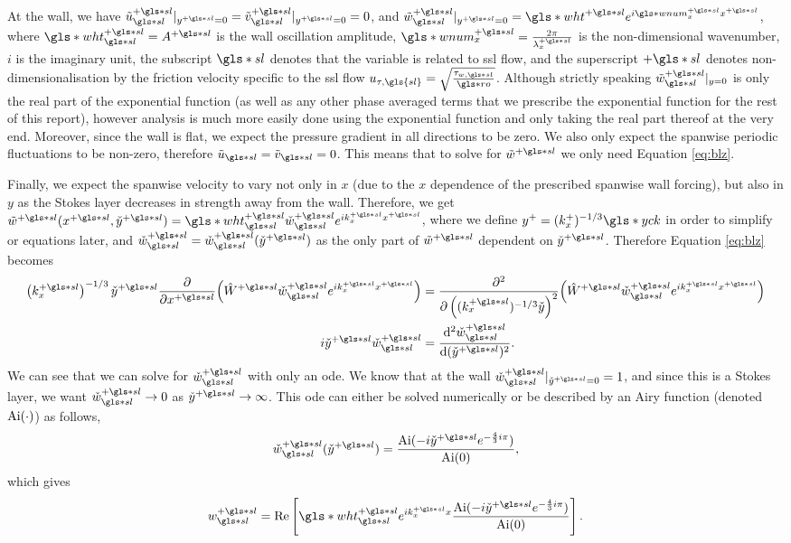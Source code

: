 At the wall, we have $\tilde{u}\ssl\ps\rvert_{y\ps=0}=\tilde{v}\ssl\ps\rvert_{y\ps=0}=0$, and $\tilde{w}\ssl\ps\rvert_{y\ps=0}=\gls*{wht}\ps e^{i \gls*{wnum}_x\ps x\ps}$, where $\gls*{wht}\ps\ssl=A\ps$ is the wall oscillation amplitude, $\gls*{wnum}_x\ps = \frac{2\pi}{\lambda_x\ps}$ is the non-dimensional wavenumber, $i$ is the imaginary unit, the subscript $\gls*{sl}$ denotes that the variable is related to \gls{ssl} flow, and the superscript $+\gls*{sl}$ denotes non-dimensionalisation by the friction velocity specific to the \gls{ssl} flow $u_{\tau,\gls{sl}}=\sqrt{\frac{\tau_{w,\gls*{sl}}}{\gls*{ro}}} $. Although strictly speaking $\tilde{w}\ssl\ps\rvert_{y=0}$ is only the real part of the exponential function (as well as any other phase averaged terms that we prescribe the exponential function for the rest of this report), however analysis is much more easily done using the exponential function and only taking the real part thereof at the very end. Moreover, since the wall is flat, we expect the pressure gradient in all directions to be zero. We also only expect the spanwise periodic fluctuations to be non-zero, therefore $\tilde{u}\ssl=\tilde{v}\ssl=0  $. This means that to solve for $\tilde{w}\ps$ we only need Equation \eqref{eq:blz}.

Finally, we expect the spanwise velocity to vary not only in $x$ (due to the  $x$ dependence of the prescribed spanwise wall forcing), but also in  $y$ as the Stokes layer decreases in strength away from the wall. Therefore, we get $\tilde{w}\ps(x\ps,\check{y}\ps)=\gls*{wht}\ps\ssl\check{w}\ssl\ps e^{ik\ps_x x\ps}$, where we define $y^{+}=(k^{+}_x)^{-1 /3}\gls*{yck}$ in order to simplify or equations later, and $\check{w}\ssl \ps=\check{w}\ssl \ps(\check{y}\ps)$ as the only part of $\tilde{w}\ps$ dependent on $\check{y}\ps$.
Therefore Equation \eqref{eq:blz} becomes
\begin{align}
	\left( k_x\ps \right) ^{-1 /3} \check{y}\ps \pdv{x\ps}(\hat{W}\ps \check{w}\ps\ssl e^{ik_x\ps x\ps})&= \pdv[2]{\left( (k_x\ps)^{-1 /3}\check{y} \right) }(\hat{W}\ps \check{w}\ps\ssl e^{ik_x\ps x\ps})\nonumber\\
	i \check{y}\ps \check{w}\ps\ssl &= \dv[2]{\check{w}\ps\ssl}{(\check{y}\ps)} 
.\end{align}
We can see that we can solve for $\check{w}\ps\ssl$ with only an \gls{ode}. We know that at the wall $\check{w}\ps\ssl\rvert_{\check{y}\ps=0}=1$, and since this is a Stokes layer, we want $\check{w}\ps\ssl \to 0$ as $\check{y}\ps\to \infty$. This \gls{ode} can either be solved numerically or be described by an Airy function (denoted $\operatorname{Ai} (\cdot)$) as follows,
 \begin{equation}
	 \check{w}\ps\ssl(\check{y}\ps)= \frac{\Ai(-i \check{y}\ps e ^{-\frac{4}{3}i\pi})}{\Ai(0)}
,\end{equation}
which gives
\begin{equation}
	w\ps\ssl = \Re \left[ \gls*{wht}\ps\ssl e^{i k_{x}\ps x}\frac{\Ai(-i \check{y}\ps e ^{-\frac{4}{3}i\pi})}{\Ai(0)}
 \right] 
.\end{equation}

